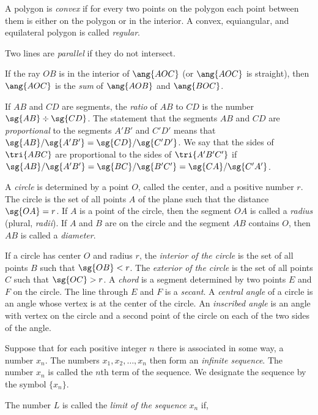 \documentclass[11pt]{book}
\theoremstyle{bkplain}
\theoremstyle{XIplainnote}
\theoremstyle{bkplain}
\theoremstyle{bkplain}
\begin{document}
\begin{applist}
      A polygon is \emph{convex} if for every two points on the polygon each
      point between them is either on the polygon or in the interior. A
      convex, equiangular, and equilateral polygon is called \emph{regular}.
\item Two lines are \emph{parallel} if they do not intersect.
\item If the ray $OB$ is in the interior of $\ang{AOC}$ (or $\ang{AOC}$ is
      straight), then $\ang{AOC}$ is the \emph{sum} of $\ang{AOB}$ and
      $\ang{BOC}$.
\item If $AB$ and $CD$ are segments, the \emph{ratio} of $AB$ to $CD$ is the
      number $\sg{AB} \div \sg{CD}$. The statement that the segments $AB$
      and $CD$ are \emph{proportional} to the segments $A'B'$ and $C'D'$
      means that $\sg{AB}/\sg{A'B'} = \sg{CD}/\sg{C'D'}$. We say that the
      sides of $\tri{ABC}$ are proportional to the sides of $\tri{A'B'C'}$
      if $\sg{AB}/\sg{A'B'} = \sg{BC}/\sg{B'C'} = \sg{CA}/\sg{C'A'}$.
\item A \emph{circle} is determined by a point $O$, called the center, and a
      positive number $r$. The circle is the set of all points $A$ of the
      plane such that the distance $\sg{OA} = r$. If $A$ is a point of the
      circle, then the segment $OA$ is called a \emph{radius} (plural,
      \emph{radii}). If $A$ and $B$ are on the circle and the segment $AB$
      contains $O$, then $AB$ is called a \emph{diameter}.
\item If a circle has center $O$ and radius $r$, the \emph{interior of the
      circle} is the set of all points $B$ such that $\sg{OB} < r$. The
      \emph{exterior of the circle} is the set of all points $C$ such that
      $\sg{OC} > r$. A \emph{chord} is a segment determined by two points
      $E$ and $F$ on the circle. The line through $E$ and $F$ is a
      \emph{secant}. A \emph{central angle} of a circle is an angle whose
      vertex is at the center of the circle. An \emph{inscribed angle} is an
      angle with vertex on the circle and a second point of the circle on
      each of the two sides of the angle.
\item Suppose that for each positive integer $n$ there is associated in some
      way, a number $x_n$. The numbers $x_1, x_2, \ldots, x_n$ then form an
      \emph{infinite sequence}. The number $x_n$ is called the $n$th term of
      the sequence. We designate the sequence by the symbol $\{x_n\}$.
\item The number $L$ is called the \emph{limit of the sequence} $x_n$ if,

\end{applist}
\end{document}
